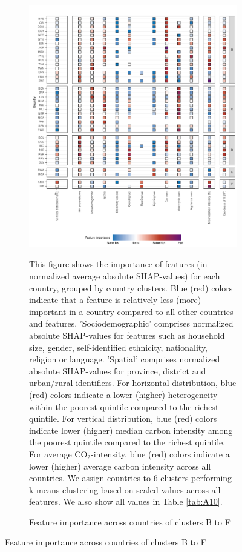 \documentclass[12pt, a4paper]{article}
\newenvironment{subcaption2}
{\strut
\vspace{-5pt}
\begin{minipage}[b]{0.9\textwidth}
  \hspace*{-\parindent}
  \footnotesize}
 {\end{minipage}}
\begin{document}
\clearpage
\begin{figure}[ht!]\ContinuedFloat
    \centering
    \begin{subfigure}[b]{\textwidth}
    \centering
    \caption{Feature importance across countries of clusters B to F}\label{fig:fig_4_2}
    \includegraphics{Figure 4/Figure_4_Corrected_2}
    \begin{subcaption2}
    This figure shows the importance of features (in normalized average absolute SHAP-values) for each country, grouped by country clusters. Blue (red) colors indicate that a feature is relatively less (more) important in a country compared to all other countries and features. 'Sociodemographic' comprises normalized absolute SHAP-values for features such as household size, gender, self-identified ethnicity, nationality, religion or language. 'Spatial' comprises normalized absolute SHAP-values for province, district and urban/rural-identifiers. For horizontal distribution, blue (red) colors indicate a lower (higher) heterogeneity within the poorest quintile compared to the richest quintile. For vertical distribution, blue (red) colors indicate lower (higher) median carbon intensity among the poorest quintile compared to the richest quintile. For average CO$_{2}$-intensity, blue (red) colors indicate a lower (higher) average carbon intensity across all countries.
    We assign countries to 6 clusters performing k-means clustering based on scaled values across all features. We also show all values in Table \ref{tab:A10}.
    \end{subcaption2}
    \end{subfigure}
    
\end{figure}
\end{document}
